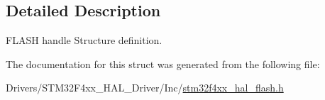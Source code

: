 \subsection{Detailed Description}
F\+L\+A\+SH handle Structure definition. 

The documentation for this struct was generated from the following file\+:\begin{DoxyCompactItemize}
\item 
Drivers/\+S\+T\+M32\+F4xx\+\_\+\+H\+A\+L\+\_\+\+Driver/\+Inc/\hyperlink{stm32f4xx__hal__flash_8h}{stm32f4xx\+\_\+hal\+\_\+flash.\+h}\end{DoxyCompactItemize}
